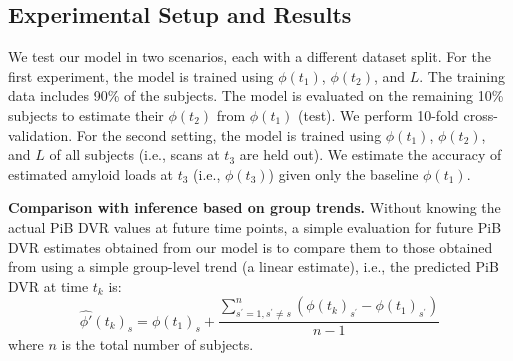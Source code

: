 \documentclass{article}
\begin{document}
\subsection{Experimental Setup and Results}
\label{ssec:split}
We test our model in two scenarios, each with a different dataset split.
For the first experiment, the model is trained using $\phi(t_1)$, $\phi(t_2)$, and $L$. The training data includes
90\% of the subjects. The model is evaluated on the remaining 10\% subjects to estimate their $\phi(t_2)$ from $\phi(t_1)$ (test).
We perform 10-fold cross-validation. For the second setting, the model is trained using $\phi(t_1)$, $\phi(t_2)$, and $L$ of all subjects
(i.e., scans at $t_3$ are held out). We estimate the accuracy of estimated amyloid loads at $t_3$ (i.e., $\phi(t_3)$) given only
the baseline $\phi(t_1)$.






\textbf{Comparison with inference based on group trends.}
Without knowing the actual PiB DVR values at future time points, a simple evaluation for future PiB DVR estimates obtained
from our model is to compare them to those obtained from using a simple
group-level trend (a linear estimate), i.e., the predicted PiB DVR at time $t_k$ is: 
\begin{equation}
\label{eqn:eq7}
   {\hat{\phi'}(t_k)_s} = \phi(t_1)_s + \frac{\sum_ {s^\prime=1, s^\prime\neq s }^{n} (\phi(t_k)_{s^\prime} - \phi(t_1)_{s^\prime})}{n-1}
\end{equation}
where $n$ is the total number of subjects.
\end{document}
